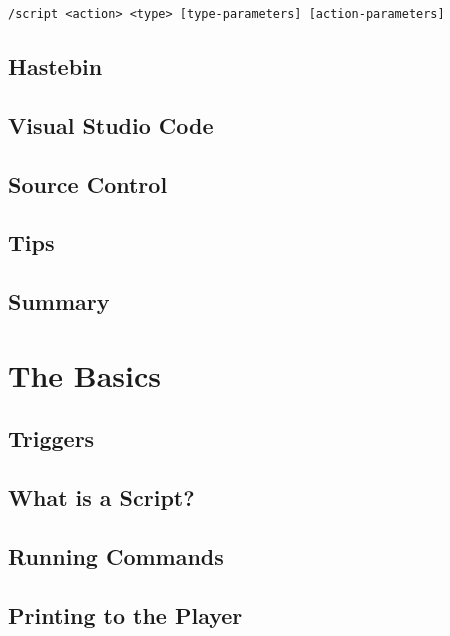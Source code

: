 \documentclass[oneside]{book}
\begin{document}
\begin{verbatim}
/script <action> <type> [type-parameters] [action-parameters]
\end{verbatim}


\section{Hastebin}
\blindtext

\section{Visual Studio Code}
\blindtext

\section{Source Control}
\blindtext

\section{Tips}
\blindtext

\section{Summary}
\blindtext

\chapter{The Basics}

\section{Triggers}
\blindtext

\section{What is a Script?}
\blindtext

\section{Running Commands}
\blindtext

\section{Printing to the Player}
\blindtext
\end{document}
